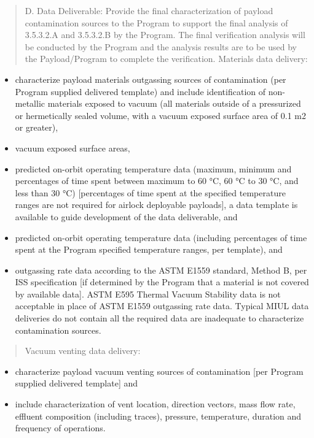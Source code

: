 \begin{quote}
D. Data Deliverable: Provide the final characterization of payload contamination sources to the Program to support the final analysis of 3.5.3.2.A and 3.5.3.2.B by the Program. The final verification analysis will be conducted by the Program and the analysis results are to be used by the Payload\slash Program to complete the verification.
Materials data delivery:
\end{quote}

\begin{itemize}
\item{} characterize payload materials outgassing sources of contamination (per Program supplied delivered template) and include identification of non-metallic materials exposed to vacuum (all materials outside of a pressurized or hermetically sealed volume, with a vacuum exposed surface area of 0.1 m2 or greater),

\item{} vacuum exposed surface areas,

\item{} predicted on-orbit operating temperature data (maximum, minimum and percentages of time spent between maximum to 60 °C, 60 °C to 30 °C, and less than 30 °C) [percentages of time spent at the specified temperature ranges are not required for airlock deployable payloads], a data template is available to guide development of the data deliverable, and

\item{} predicted on-orbit operating temperature data (including percentages of time spent at the Program specified temperature ranges, per template), and

\item{} outgassing rate data according to the ASTM E1559 standard, Method B, per ISS specification [if determined by the Program that a material is not covered by available data]. ASTM E595 Thermal Vacuum Stability data is not acceptable in place of ASTM E1559 outgassing rate data. Typical MIUL data deliveries do not contain all the required data are inadequate to characterize contamination sources.

\end{itemize}

\begin{quote}
Vacuum venting data delivery:
\end{quote}

\begin{itemize}
\item{} characterize payload vacuum venting sources of contamination [per Program supplied delivered template] and

\item{} include characterization of vent location, direction vectors, mass flow rate, effluent composition (including traces), pressure, temperature, duration and frequency of operations.

\end{itemize}

